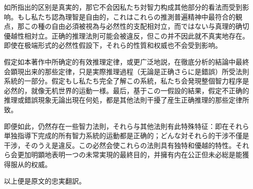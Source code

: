 \documentclass[a4paper,11pt,openany]{ltjsbook}
\begin{document}
如所指出的区别是真実的，那它不会因私たち対智力构成其他部分的看法而受到影响。もし私たち認為理智是自由的，これはこれらの推測普遍精神中最符合的観点，那この種の自由必須被視為与必然性的支配相対立，而ではない与真理的确切優越性相対立。正确的推理法則可能会被違反，但この并不因此就不真実地存在。即使在极端形式的必然性假設下，それら的性質和权威也不会受到影响。

假定如本著作中所确定的有效推理定律，或更广泛地説，在徹底分析的結論中最終会顕現出来的那些定律，只是実際推理過程（无論是正确さらに是錯誤）所受法則系統的一部分。假定もし私たち完全了解この系統，私たち会発現整個智力程序是必然的，就像无机世界的运動一様。最后，基于この一假設的結果，假定不正确的推理或錯誤現象无論出現在何処，都是其他法則干擾了産生正确推理的那些定律所致。

即便如此，仍然存在一些智力法則，それら与其他法則有此特殊特征：即在それら単独指導下完成的所有智力系統的运動都是正确的；どんな対それら的干涉不僅是干涉，そのうえ是違反。この必然会使これらの法則具有独特和優越的特性。それら会更加明顕地表明一つの未常実現的最終目的，并擁有内在公正但未必総是能獲得服从的权威。

以上便是原文的忠実翻訳。
\end{document}
